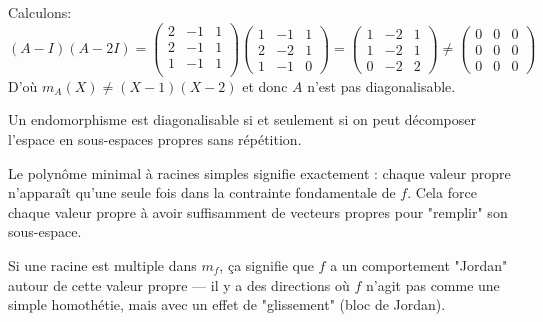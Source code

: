 \begin{eg}
\begin{enumerate}
\[            \] 
            Calculons:
            \[
                (A - I)(A - 2I) = \begin{pmatrix} 
                    2 & -1 & 1\\
                    2 & -1 & 1\\
                    1 & -1 & 1\\
                \end{pmatrix} 
                \begin{pmatrix} 
                    1 & -1 & 1\\
                    2 & -2 & 1\\
                    1 & -1 & 0
                \end{pmatrix} 
                =
            \begin{pmatrix}
            1 & -2 & 1 \\
            1 & -2 & 1 \\
            0 & -2 & 2
            \end{pmatrix} \neq \begin{pmatrix} 0 & 0 & 0\\  0 & 0 & 0\\ 0 & 0 & 0 \end{pmatrix} 
            \] 
            D'où $m_A(X) \neq (X-1)(X-2)$ et donc $A$ n'est pas diagonalisable.
   \end{enumerate} 
\end{eg}
\begin{intuition}
   Un endomorphisme est diagonalisable si et seulement si on peut décomposer
   l'espace en sous-espaces propres sans répétition.

Le polynôme minimal à racines simples signifie exactement : chaque valeur
propre n'apparaît qu'une seule fois dans la contrainte fondamentale de $f$.
Cela force chaque valeur propre à avoir suffisamment de vecteurs propres pour
"remplir" son sous-espace.

Si une racine est multiple dans $m_f$, ça signifie que $f$ a un comportement
"Jordan" autour de cette valeur propre — il y a des directions où $f$ n'agit
pas comme une simple homothétie, mais avec un effet de "glissement" (bloc de
Jordan).
\end{intuition}
